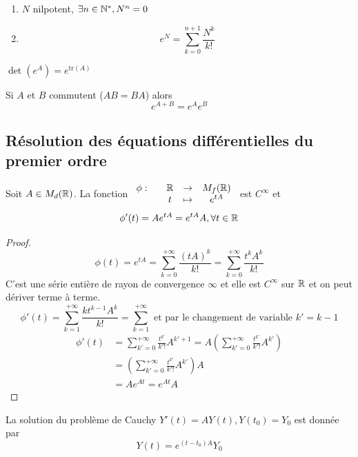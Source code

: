\documentclass[]{report}
\begin{document}
\begin{ex}
\begin{enumerate}
        \item $N$ nilpotent, $\exists n\in \mathbb{N}^*,N^{n}=0$
        \item \[e^N=\sum_{k=0}^{n+1}\frac{N^k}{k!}\]
        
    \end{enumerate}
\end{ex}

\begin{prop}
    $\det (e^A)=e^{\text{tr} (A)}$
\end{prop}

\begin{prop}
    Si $A$ et $B$ commutent ($AB=BA$) alors
    \[e^{A+B}=e^A e^B\]
\end{prop}

\subsection{Résolution des équations différentielles du premier ordre}

\begin{prop}
    Soit $A\in M_d(\mathbb{R})$. La fonction $\begin{array}{ccccc} \phi : & & \mathbb{R} & \to & M_f(\mathbb{R}) \\ & & t & \mapsto & e^{tA} \end{array}$ est $C^{\infty}$ et 
    \[\phi'(t)=Ae^{tA}=e^{tA}A,\forall t\in \mathbb{R}\]
\end{prop}

\begin{proof}
    \[\phi(t)=e^{tA}=\sum_{k=0}^{+\infty}\frac{(tA)^{k}}{k!}=\sum_{k=0}^{+\infty}\frac{t^k A^k}{k!}\]
    C'est une série entière de rayon de convergence $\infty$ et elle est $C^\infty$ sur $\mathbb{R}$ et on peut dériver terme à terme.
    \[\phi'(t)=\sum_{k=1}^{+\infty}\frac{k t^{k-1}A^k}{k!}=\sum_{k=1}^{+\infty}\text{ et par le changement de variable }k'=k-1\]
    \begin{align*}
        \phi'(t)&=\sum_{k'=0}^{+\infty}\frac{t^{k'}}{k'!}A^{k'+1}=A\left(\sum_{k'=0}^{+\infty}\frac{t^{k'}}{k'!}A^{k'}\right)\\
        &=\left(\sum_{k'=0}^{+\infty}\frac{t^{k'}}{k'!}A^{k'}\right)A\\
        &=Ae^{At}=e^{At}A
    \end{align*}
\end{proof}

\begin{cor}
    La solution du problème de Cauchy $Y'(t)=AY(t),Y(t_0)=Y_0$ est donnée par 
    \[Y(t)=e^{(t-t_0)A}Y_0\]
\end{cor}
\end{document}
